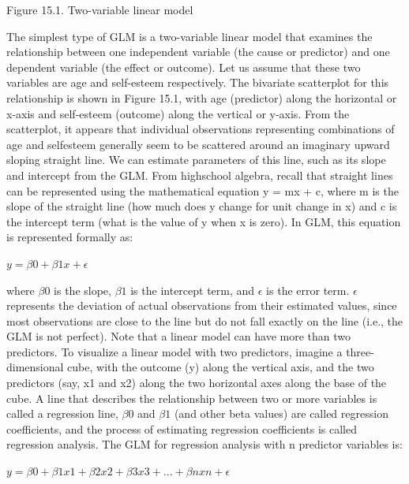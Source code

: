 Figure 15.1. Two-variable linear model

The simplest type of GLM is a two-variable linear model that examines the relationship between one independent variable (the cause or predictor) and one dependent variable (the effect or outcome). Let us assume that these two variables are age and self-esteem respectively. The bivariate scatterplot for this relationship is shown in Figure 15.1, with age (predictor) along the horizontal or x-axis and self-esteem (outcome) along the vertical or y-axis. From the scatterplot, it appears that individual observations representing combinations of age and selfesteem generally seem to be scattered around an imaginary upward sloping straight line. We can estimate parameters of this line, such as its slope and intercept from the GLM. From highschool algebra, recall that straight lines can be represented using the mathematical equation y = mx + c, where m is the slope of the straight line (how much does y change for unit change in x) and c is the intercept term (what is the value of y when x is zero). In GLM, this equation is represented formally as:

$ y = \beta0 + \beta1 x + \epsilon $

where $ \beta0 $ is the slope, $ \beta1 $ is the intercept term, and $ \epsilon $ is the error term. $ \epsilon $ represents the deviation of actual observations from their estimated values, since most observations are close to the line but do not fall exactly on the line (i.e., the GLM is not perfect). Note that a linear model can have more than two predictors. To visualize a linear model with two predictors, imagine a three-dimensional cube, with the outcome (y) along the vertical axis, and the two predictors (say, x1 and x2) along the two horizontal axes along the base of the cube. A line that describes the relationship between two or more variables is called a regression line, $ \beta0 $ and $ \beta1 $ (and other beta values) are called regression coefficients, and the process of estimating regression coefficients is called regression analysis. The GLM for regression analysis with n predictor variables is:

$ y = \beta0 + \beta1 x1 + \beta2 x2 + \beta3 x3 + ... + \beta n xn + \epsilon $

